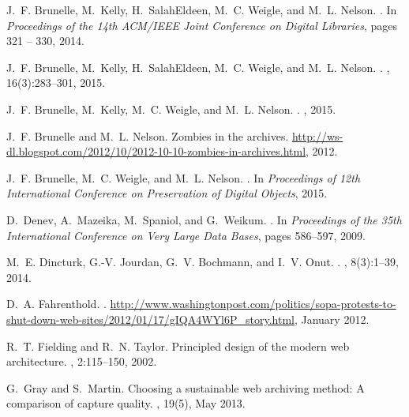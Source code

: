\documentclass{sig-alternate}
\begin{document}
\begin{thebibliography}{10}
J.~F. Brunelle, M.~Kelly, H.~SalahEldeen, M.~C. Weigle, and M.~L. Nelson.
.
\newblock In {\em {Proceedings of the 14th ACM/IEEE Joint Conference on Digital
  Libraries}}, pages 321 -- 330, 2014.

J.~F. Brunelle, M.~Kelly, H.~SalahEldeen, M.~C. Weigle, and M.~L. Nelson.
.
, 16(3):283--301,
  2015.

J.~F. Brunelle, M.~Kelly, M.~C. Weigle, and M.~L. Nelson.
.
, 2015.

J.~F. Brunelle and M.~L. Nelson.
\newblock Zombies in the archives.
\newblock
  \url{http://ws-dl.blogspot.com/2012/10/2012-10-10-zombies-in-archives.html},
  2012.

J.~F. Brunelle, M.~C. Weigle, and M.~L. Nelson.
.
\newblock In {\em {Proceedings of 12th International Conference on Preservation
  of Digital Objects}}, 2015.

D.~Denev, A.~Mazeika, M.~Spaniol, and G.~Weikum.
.
\newblock In {\em {Proceedings of the 35th International Conference on Very
  Large Data Bases}}, pages 586--597, 2009.

M.~E. Dincturk, G.-V. Jourdan, G.~V. Bochmann, and I.~V. Onut.
.
, 8(3):1--39, 2014.

D.~A. Fahrenthold.
.
\newblock
  \url{http://www.washingtonpost.com/politics/sopa-protests-to-shut-down-web-sites/2012/01/17/gIQA4WYl6P_story.html},
  January 2012.

R.~T. Fielding and R.~N. Taylor.
\newblock Principled design of the modern web architecture.
, 2:115--150, 2002.

G.~Gray and S.~Martin.
\newblock Choosing a sustainable web archiving method: A comparison of capture
  quality.
, 19(5), May 2013.


\end{thebibliography}
\end{document}
